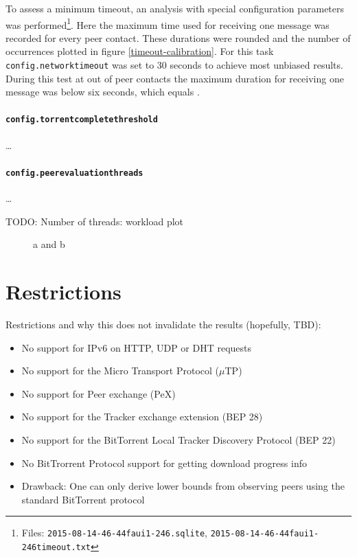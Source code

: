 \documentclass[10pt, a4paper, twoside, headsepline]{scrbook}
\renewcommand{\_}{\origunderscore\allowbreak}
\newcommand{\config}[1]{\texttt{config.\allowbreak #1}}
\begin{document}
To assess a minimum timeout, an analysis with special configuration parameters was performed\footnote{Files: \texttt{2015-08-14\_17-46-44\_faui1-246.sqlite}, \texttt{2015-08-14\_17-46-44\_faui1-246\_timeout.txt}}. Here the maximum time used for receiving one message was recorded for every peer contact. These durations were rounded and the number of occurrences plotted in figure \ref{timeout-calibration}. For this task \config{network\_timeout} was set to 30 seconds to achieve most unbiased results. During this test at  out of  peer contacts the maximum duration for receiving one message was below six seconds, which equals .

\paragraph{\config{torrent\_complete\_threshold}}
\dots

\paragraph{\config{peer\_evaluation\_threads}}
\dots

TODO: Number of threads: workload plot

\begin{figure}
\centering
\caption[Load parameters during the analysis]{a and b}
\label{load}
\end{figure}

\section{Restrictions}

Restrictions and why this does not invalidate the results (hopefully, TBD):

\begin{itemize}
  \item No support for IPv6 on HTTP, UDP or DHT requests
  \item No support for the Micro Transport Protocol ($\mu$TP)
  \item No support for Peer exchange (PeX)
  \item No support for the Tracker exchange extension (BEP 28)
  \item No support for the BitTorrent Local Tracker Discovery Protocol (BEP 22)
  \item No BitTrorrent Protocol support for getting download progress info
  \item Drawback: One can only derive lower bounds from observing peers using the standard BitTorrent protocol
\end{itemize}
\end{document}
